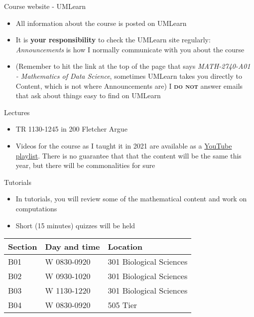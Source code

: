 \documentclass[aspectratio=169]{beamer}\usepackage[]{graphicx}\usepackage[]{xcolor}
\begin{document}
\begin{frame}{Course website - UMLearn}
\begin{itemize}
\item All information about the course is posted on UMLearn
\vfill
\item It is \textbf{your responsibility} to check the UMLearn site regularly: \textit{Announcements} is how I normally communicate with you about the course
\vfill
\item (Remember to hit the link at the top of the page that says \textit{MATH-2740-A01 - Mathematics of Data Science}, sometimes UMLearn takes you directly to Content, which is not where Announcements are)
\vfill {} I \textsc{\textbf{do not}} answer emails that ask about things easy to find on UMLearn
\end{itemize}
\end{frame}

\begin{frame}{Lectures}
\begin{itemize}
\item TR 1130-1245 in 200 Fletcher Argue
\vfill
\item Videos for the course as I taught it in 2021 are available as a \href{https://www.youtube.com/playlist?list=PLfRaznSpWo2vQAn1jVyueTuAiryDaxkH3}{YouTube playlist}. There is no guarantee that that the content will be the same this year, but there will be commonalities for sure
\end{itemize}
\end{frame}

\begin{frame}{Tutorials}
\begin{itemize}
\item In tutorials, you will review some of the mathematical content and work on computations
\vfill
\item Short (15 minutes) quizzes will be held
\end{itemize}
\vfill
\begin{center}
\begin{tabular}{lll}
\toprule
Section & Day and time & Location \\
\midrule
B01 & W 0830-0920 & 301 Biological Sciences \\
B02 & W 0930-1020 & 301 Biological Sciences \\
B03 & W 1130-1220 & 301 Biological Sciences \\
B04 & W 0830-0920 & 505 Tier \\
\bottomrule
\end{tabular}
\end{center}
\end{frame}
\end{document}
